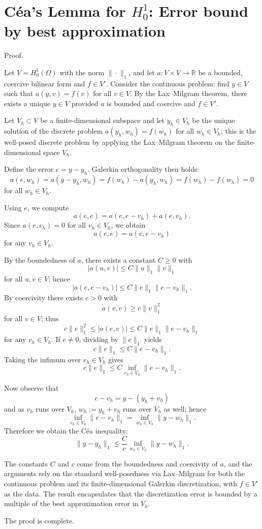 \documentclass[11pt]{article}
\begin{document}
\section*{Céa's Lemma for $H^1_0$: Error bound by best approximation}

Proof.

Let $V = H^1_0(\Omega)$ with the norm $\|\cdot\|_1$, and let
$a: V \times V \to \mathbb{R}$ be a bounded, coercive bilinear form and
$f \in V'$. Consider the continuous problem: find $y \in V$ such that
$a(y, v) = f(v)$ for all $v \in V$. By the Lax--Milgram theorem, there exists
a unique $y \in V$ provided $a$ is bounded and coercive and $f \in V'$.

Let $V_h \subset V$ be a finite-dimensional subspace and let $y_h \in V_h$
be the unique solution of the discrete problem
$a(y_h, w_h) = f(w_h)$ for all $w_h \in V_h$; this is the well-posed discrete
problem by applying the Lax--Milgram theorem on the finite-dimensional space
$V_h$.

Define the error $e = y - y_h$. Galerkin orthogonality then holds:
\[
a(e, w_h) = a(y - y_h, w_h) = f(w_h) - a(y_h, w_h) = f(w_h) - f(w_h) = 0
\]
for all $w_h \in V_h$.

Using $e$, we compute
\[
a(e, e) = a(e, e - v_h) + a(e, v_h).
\]
Since $a(e, v_h) = 0$ for all $v_h \in V_h$, we obtain
\[
a(e, e) = a(e, e - v_h)
\]
for any $v_h \in V_h$.

By the boundedness of $a$, there exists a constant $C \ge 0$ with
\[
|a(u, v)| \le C \|u\|_1 \|v\|_1
\]
for all $u, v \in V$; hence
\[
|a(e, e - v_h)| \le C \|e\|_1 \|e - v_h\|_1.
\]
By coercivity there exists $c > 0$ with
\[
a(v, v) \ge c \|v\|_1^2
\]
for all $v \in V$; thus
\[
c \|e\|_1^2 \le |a(e, e)| \le C \|e\|_1 \|e - v_h\|_1
\]
for any $v_h \in V_h$. If $e \ne 0$, dividing by $\|e\|_1$ yields
\[
c \|e\|_1 \le C \|e - v_h\|_1.
\]
Taking the infimum over $v_h \in V_h$ gives
\[
c \|e\|_1 \le C \inf_{v_h \in V_h} \|e - v_h\|_1.
\]

Now observe that
\[
e - v_h = y - (y_h + v_h)
\]
and as $v_h$ runs over $V_h$, $w_h := y_h + v_h$ runs over $V_h$ as well;
hence
\[
\inf_{v_h \in V_h} \|e - v_h\|_1
=
\inf_{w_h \in V_h} \|y - w_h\|_1.
\]
Therefore we obtain the Céa inequality:
\[
\|y - y_h\|_1 \le \frac{C}{c} \inf_{w_h \in V_h} \|y - w_h\|_1.
\]

The constants $C$ and $c$ come from the boundedness and coercivity of $a$,
and the arguments rely on the standard well-posedness via Lax--Milgram for both
the continuous problem and its finite-dimensional Galerkin discretization, with
$f \in V'$ as the data. The result encapsulates that the discretization error
is bounded by a multiple of the best approximation error in $V_h$.

The proof is complete.
\end{document}
